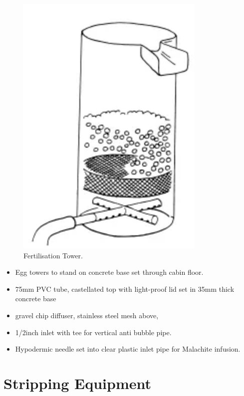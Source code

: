 \begin{figure}[H]
  \centering
   \includegraphics[scale = 0.5]{images/FertilisationTower.png}
  \caption{Fertilisation Tower.}
   \label{fig:FertilisationTower}
\end{figure}



                  \begin{itemize}
                  \item  Egg towers to stand on concrete base set through cabin floor. 
                  \item 75mm PVC tube, castellated top with light-proof lid set in 35mm thick concrete base
                  \item gravel chip diffuser, stainless steel mesh above, 
                  \item 1/2inch inlet with tee for vertical anti bubble pipe.  
                  \item Hypodermic needle set into clear plastic inlet pipe for Malachite infusion.
                  \end{itemize}
                  
 
\section{Stripping Equipment}

